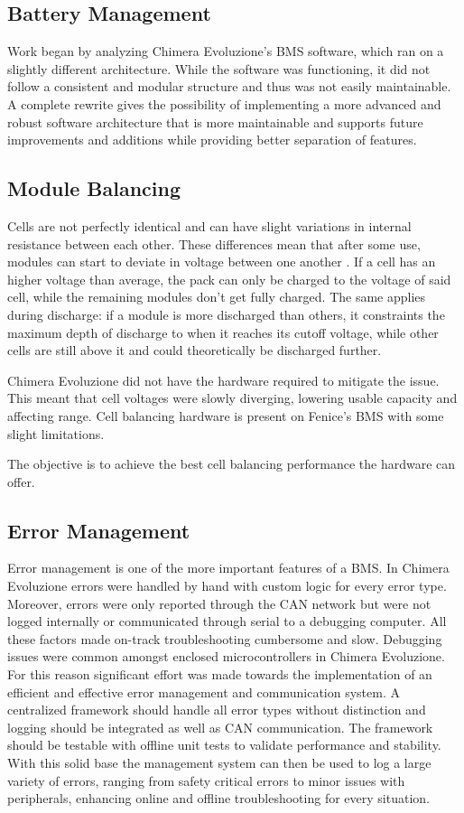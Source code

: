 \subsection{Battery Management}

Work began by analyzing Chimera Evoluzione's BMS software, which ran on a slightly different architecture. While the software was functioning, it did not follow a consistent and modular structure and thus was not easily maintainable. A complete rewrite gives the possibility of implementing a more advanced and robust software architecture that is more maintainable and supports future improvements and additions while providing better separation of features.

\subsection{Module Balancing}
Cells are not perfectly identical and can have slight variations in internal resistance between each other. These differences mean that after some use, modules can start to deviate in voltage between one another \cite{6966514}. If a cell has an higher voltage than average, the pack can only be charged to the voltage of said cell, while the remaining modules don't get fully charged. The same applies during discharge: if a module is more discharged than others, it constraints the maximum depth of discharge to when it reaches its cutoff voltage, while other cells are still above it and could theoretically be discharged further.

Chimera Evoluzione did not have the hardware required to mitigate the issue. This meant that cell voltages were slowly diverging, lowering usable capacity and affecting range. Cell balancing hardware is present on Fenice's BMS with some slight limitations.

The objective is to achieve the best cell balancing performance the hardware can offer.

\subsection{Error Management}
Error management is one of the more important features of a BMS. In Chimera Evoluzione errors were handled by hand with custom logic for every error type. Moreover, errors were only reported through the CAN network but were not logged internally or communicated through serial to a debugging computer. All these factors made on-track troubleshooting cumbersome and slow. Debugging issues were common amongst enclosed microcontrollers in Chimera Evoluzione. For this reason significant effort was made towards the implementation of an efficient and effective error management and communication system. A centralized framework should handle all error types without distinction and logging should be integrated as well as CAN communication. The framework should be testable with offline unit tests to validate performance and stability. With this solid base the management system can then be used to log a large variety of errors, ranging from safety critical errors to minor issues with peripherals, enhancing online and offline troubleshooting for every situation.

\newpage

